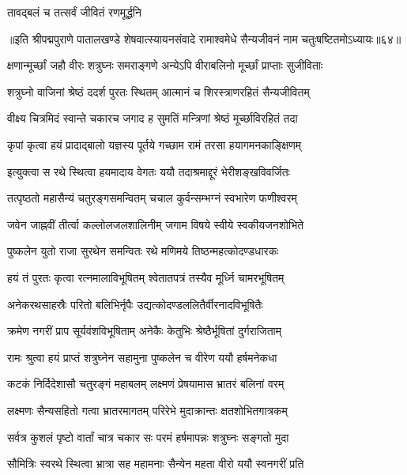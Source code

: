 \onelineshloka
{तावद्बलं च तत्सर्वं जीवितं रणमूर्द्धनि}%

{॥इति श्रीपद्मपुराणे पातालखण्डे शेषवात्स्यायनसंवादे रामाश्वमेधे सैन्यजीवनं नाम चतुःषष्टितमोऽध्यायः॥६४॥}



\twolineshloka
{क्षणान्मूर्च्छां जहौ वीरः शत्रुघ्नः समराङ्गणे}
{अन्येऽपि वीराबलिनो मूर्च्छां प्राप्ताः सुजीविताः}%

\twolineshloka
{शत्रुघ्नो वाजिनां श्रेष्ठं ददर्श पुरतः स्थितम्}
{आत्मानं च शिरस्त्राणरहितं सैन्यजीवितम्}%

\twolineshloka
{वीक्ष्य चित्रमिदं स्वान्ते चकारच जगाद ह}
{सुमतिं मन्त्रिणां श्रेष्ठं मूर्च्छाविरहितं तदा}%

\twolineshloka
{कृपां कृत्वा हयं प्रादाद्बालो यज्ञस्य पूर्तये}
{गच्छाम रामं तरसा हयागमनकाङ्क्षिणम्}%

\twolineshloka
{इत्युक्त्वा स रथे स्थित्वा हयमादाय वेगतः}
{ययौ तदाश्रमाद्दूरं भेरीशङ्खविवर्जितः}%

\twolineshloka
{तत्पृष्ठतो महासैन्यं चतुरङ्गसमन्वितम्}
{चचाल कुर्वन्सम्भग्नं स्वभारेण फणीश्वरम्}%

\twolineshloka
{जवेन जाह्नवीं तीर्त्वा कल्लोलजलशालिनीम्}
{जगाम विषये स्वीये स्वकीयजनशोभिते}%

\twolineshloka
{पुष्कलेन युतो राजा सुरथेन समन्वितः}
{रथे मणिमये तिष्ठन्महत्कोदण्डधारकः}%

\twolineshloka
{हयं तं पुरतः कृत्वा रत्नमालाविभूषितम्}
{श्वेतातपत्रं तस्यैव मूर्ध्नि चामरभूषितम्}%

\twolineshloka
{अनेकरथसाहस्रैः परितो बलिभिर्नृपैः}
{उद्यत्कोदण्डललितैर्वीरनादविभूषितैः}%

\twolineshloka
{क्रमेण नगरीं प्राप सूर्यवंशविभूषिताम्}
{अनेकैः केतुभिः श्रेष्ठैर्भूषितां दुर्गराजिताम्}%

\twolineshloka
{रामः श्रुत्वा हयं प्राप्तं शत्रुघ्नेन सहामुना}
{पुष्कलेन च वीरेण ययौ हर्षमनेकधा}%

\twolineshloka
{कटकं निर्दिदेशासौ चतुरङ्गं महाबलम्}
{लक्ष्मणं प्रेषयामास भ्रातरं बलिनां वरम्}%

\twolineshloka
{लक्ष्मणः सैन्यसहितो गत्वा भ्रातरमागतम्}
{परिरेभे मुदाक्रान्तः क्षतशोभितगात्रकम्}%

\twolineshloka
{सर्वत्र कुशलं पृष्टो वार्तां चात्र चकार सः}
{परमं हर्षमापन्नः शत्रुघ्नः सङ्गतो मुदा}%

\twolineshloka
{सौमित्रिः स्वरथे स्थित्वा भ्रात्रा सह महामनाः}
{सैन्येन महता वीरो ययौ स्वनगरीं प्रति}%

